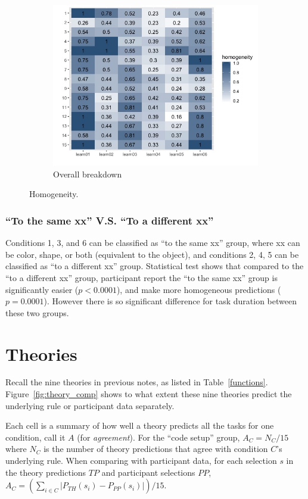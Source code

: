 \documentclass{article}
\begin{document}
\begin{figure}[h!]
\begin{subfigure}[t]{0.33\textwidth}
    \includegraphics[width=\linewidth]{var_all} 
    \caption{Overall breakdown}
  \end{subfigure}
  \caption{Homogeneity.}
  \label{fig:var}
\end{figure}

\subsubsection*{``To the same xx'' V.S. ``To a different xx''}

Conditions 1, 3, and 6 can be classified as ``to the same xx'' group, where xx can be color, shape, or both (equivalent to the object), and conditions 2, 4, 5 can be classified as ``to a different xx'' group. Statistical test shows that compared to the ``to a different xx'' group, participant report the ``to the same xx'' group is significantly easier ($p<0.0001$), and make more homogeneous predictions ($p=0.0001$). However there is so significant difference for task duration between these two groups.


\section{Theories}

Recall the nine theories in previous notes, as listed in Table~\ref{functions}. Figure~\ref{fig:theory_comp} shows to what extent these nine theories predict the underlying rule or participant data separately.

Each cell is a summary of how well a theory predicts all the tasks for one condition, call it $A$ (for \emph{agreement}). For the ``code setup'' group, $A_C = N_C/15$ where $N_C$ is the number of theory predictions that agree with condition $C$'s underlying rule. When comparing with participant data, for each selection $s$ in the theory predictions $TP$ and participant selections $PP$, $A_C = (\sum_{i \in C}|P_{TH}(s_i) - P_{PP}(s_i)|)/15$.
\end{document}
